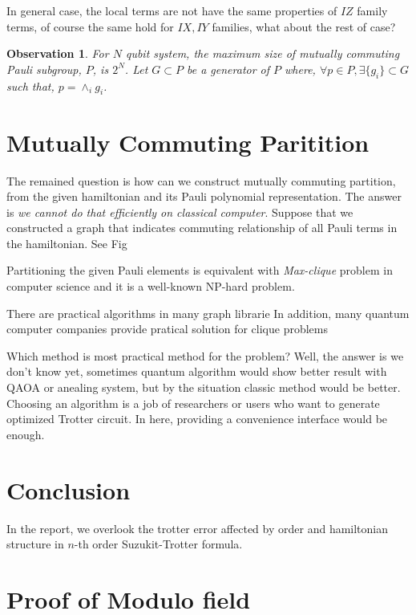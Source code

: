 \documentclass[a4paper,12pt]{article}
\newtheorem{observation}{Observation}
\begin{document}
In general case, the local terms are not have the same properties 
of $IZ$ family terms, of course the same hold for $IX, IY$ families,
what about the rest of case?

\begin{observation}
For $N$ qubit system, the maximum size of mutually commuting Pauli subgroup, $P$, is $2^N$.
Let $G \subset P$ be a generator of $P$ where, $\forall p \in P, \exists \{g_i\} \subset G$
such that, $p = \wedge_i g_i$.
\end{observation}

\section{Mutually Commuting Paritition}

The remained question is how can we construct mutually commuting partition, 
from the given hamiltonian and its Pauli polynomial representation.
The answer is \textit{we cannot do that efficiently on classical computer}.
Suppose that we constructed a graph that indicates commuting relationship
of all Pauli terms in the hamiltonian. See Fig %

Partitioning the given Pauli elements is equivalent with \textit{Max-clique}
problem in computer science and it is a well-known NP-hard problem.

There are practical algorithms in many graph librarie%
In addition, many quantum computer companies provide pratical solution for clique problems 

Which method is most practical method for the problem? 
Well, the answer is we don't know yet, sometimes quantum algorithm would show better result
with QAOA or anealing system,
but by the situation classic method would be better.
Choosing an algorithm is a job of researchers or users who want to generate optimized 
Trotter circuit. 
In here, providing a convenience interface would be enough.

\section{Conclusion}

In the report, we overlook the trotter error affected by order and hamiltonian structure 
in $n$-th order Suzukit-Trotter formula.

\appendix

\section{Proof of Modulo field}
\label{appendix:modulo_field}
\end{document}
